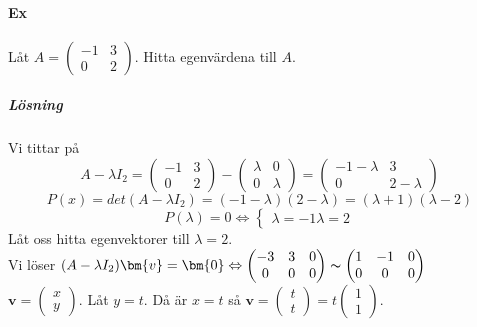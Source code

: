 \paragraph{Ex} Låt $A=\begin{pmatrix}-1&3\\0&2\end{pmatrix}$.
Hitta egenvärdena till $A$.
\subparagraph{Lösning} Vi tittar på 
\begin{equation*}
    A-\lambda I_2=
    \begin{pmatrix}-1&3\\0&2\end{pmatrix}-\begin{pmatrix}\lambda&0\\0&\lambda\end{pmatrix}=
    \begin{pmatrix}-1-\lambda&3\\0&2-\lambda\end{pmatrix}
\end{equation*}
\begin{equation*}
    P(x)=det(A-\lambda I_2)=(-1-\lambda)(2-\lambda)=(\lambda+1)(\lambda-2)
\end{equation*}
\begin{equation*}
    P(\lambda)=0\Leftrightarrow\begin{cases}
        \lambda=-1
        \lambda=2
    \end{cases}
\end{equation*}
Låt oss hitta egenvektorer till $\lambda=2$.\\
Vi löser $(A-\lambda I_2)\bm{v}=\bm{0}\Leftrightarrow
\begin{pmatrix}
    -3&3&0\\0&0&0
\end{pmatrix}
\thicksim
\begin{pmatrix}
    1&-1&0\\0&0&0
\end{pmatrix}$\\
$\bm{v}=\begin{pmatrix}x\\y\end{pmatrix}$.
Låt $y=t$.
Då är $x=t$ så $\bm{v}=\begin{pmatrix}t\\t\end{pmatrix}=t\begin{pmatrix}1\\1\end{pmatrix}$.

